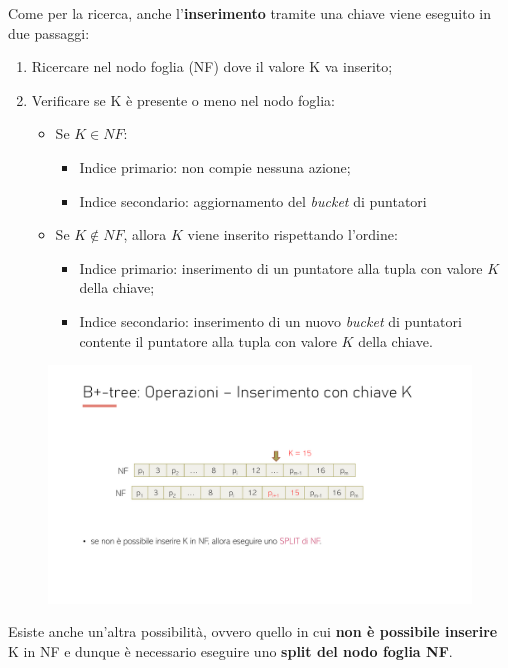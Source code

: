 \documentclass[a4paper]{article}
\begin{document}
	Come per la ricerca, anche l'\textbf{inserimento} tramite una chiave viene eseguito in due passaggi:
	\begin{enumerate}
		\item Ricercare nel nodo foglia (NF) dove il valore K va inserito;
		
		\item Verificare se K è presente o meno nel nodo foglia:
		\begin{itemize}
			\item Se $K \in NF$:
			\begin{itemize}
				\item Indice primario: non compie nessuna azione;
				\item Indice secondario: aggiornamento del \emph{bucket} di puntatori 
			\end{itemize}
			
			\item Se $K \notin NF$, allora $K$ viene inserito rispettando l'ordine:
			\begin{itemize}
				\item Indice primario: inserimento di un puntatore alla tupla con valore $K$ della chiave;
				\item Indice secondario: inserimento di un nuovo \emph{bucket} di puntatori contente il puntatore alla tupla con valore $K$ della chiave.
			\end{itemize}
		\end{itemize}
	\end{enumerate}
	\begin{figure}[!htp]
		\centering
		\includegraphics[width=\textwidth]{img/inserimento-1.pdf}
	\end{figure}
	
	\noindent
	Esiste anche un'altra possibilità, ovvero quello in cui \textbf{non è possibile inserire} K in NF e dunque è necessario eseguire uno \textbf{split del nodo foglia NF}.\newline
	
\end{document}
